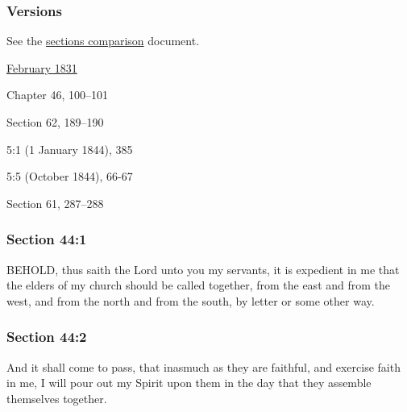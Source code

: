 	\subsubsection{Versions}
		\label{DC44-V}
		
		See the \href{https://drive.google.com/file/d/1goAvNz8jS4R8slYfMG_db55Ty2z_vmgK/view?usp=sharing}{sections comparison} document.
	
		\begin{compactdesc}
			\item[JSP] \hyperref[EMS-1831-JS-FEB-1831-B]{February 1831}
			\item[BC] Chapter 46, 100--101
			\item[DC 1835] Section 62, 189--190
			\item[TS] 5:1 (1 January 1844), 385
			\item[MS] 5:5 (October 1844), 66-67
			\item[DC 1844] Section 61, 287--288
		\end{compactdesc}

	\subsubsection{Section 44:1} %
		\label{DC44-1}

		BEHOLD, thus saith the Lord unto you my servants, it is expedient in me that the elders of my church should be called together, from the east and from the west, and from the north and from the south, by letter or some other way.


	\subsubsection{Section 44:2} %
		\label{DC44-2}

		And it shall come to pass, that inasmuch as they are faithful, and exercise faith in me, I will pour out my Spirit upon them in the day that they assemble themselves together.

